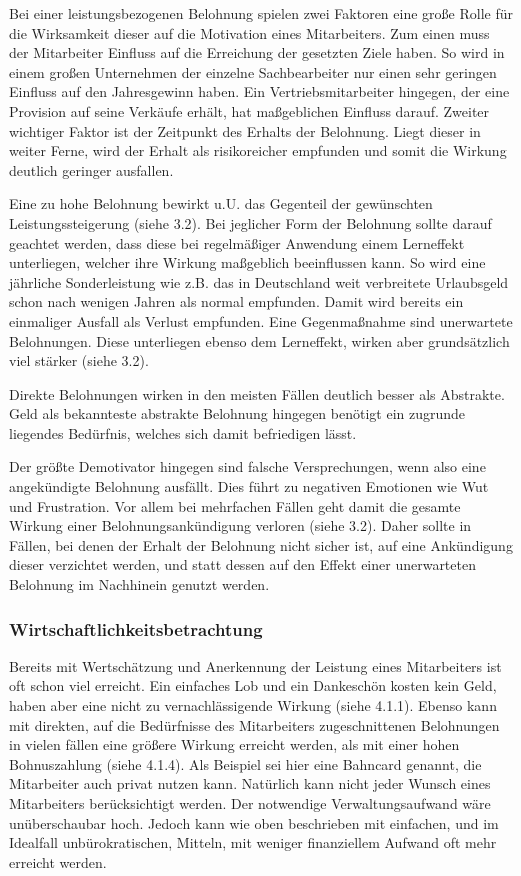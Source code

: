 Bei einer leistungsbezogenen Belohnung spielen zwei Faktoren eine große Rolle für die Wirksamkeit dieser auf die Motivation eines Mitarbeiters. Zum einen muss der Mitarbeiter Einfluss auf die Erreichung der gesetzten Ziele haben. So wird in einem großen Unternehmen der einzelne Sachbearbeiter nur einen sehr geringen Einfluss auf den Jahresgewinn haben. Ein Vertriebsmitarbeiter hingegen, der eine Provision auf seine Verkäufe erhält, hat maßgeblichen Einfluss darauf.
Zweiter wichtiger Faktor ist der Zeitpunkt des Erhalts der Belohnung. Liegt dieser in weiter Ferne, wird der Erhalt als risikoreicher empfunden und somit die Wirkung deutlich geringer ausfallen.

Eine zu hohe Belohnung bewirkt u.U. das Gegenteil der gewünschten Leistungssteigerung (siehe 3.2). Bei jeglicher Form der Belohnung sollte darauf geachtet werden, dass diese bei regelmäßiger Anwendung einem Lerneffekt unterliegen, welcher ihre Wirkung maßgeblich beeinflussen kann. So wird eine jährliche Sonderleistung wie z.B. das in Deutschland weit verbreitete Urlaubsgeld schon nach wenigen Jahren als normal empfunden. Damit wird bereits ein einmaliger Ausfall als Verlust empfunden. Eine Gegenmaßnahme sind unerwartete Belohnungen. Diese unterliegen ebenso dem Lerneffekt, wirken aber grundsätzlich viel stärker (siehe 3.2). 

Direkte Belohnungen wirken in den meisten Fällen deutlich besser als Abstrakte. Geld als bekannteste abstrakte Belohnung hingegen benötigt ein zugrunde liegendes Bedürfnis, welches sich damit befriedigen lässt.

Der größte Demotivator hingegen sind falsche Versprechungen, wenn also eine angekündigte Belohnung ausfällt. Dies führt zu negativen Emotionen wie Wut und Frustration. Vor allem bei mehrfachen Fällen geht damit die gesamte Wirkung einer Belohnungsankündigung verloren (siehe 3.2). Daher sollte in Fällen, bei denen der Erhalt der Belohnung nicht sicher ist, auf eine Ankündigung dieser verzichtet werden, und statt dessen auf den Effekt einer unerwarteten Belohnung im Nachhinein genutzt werden. 

\subsubsection{Wirtschaftlichkeitsbetrachtung}
Bereits mit Wertschätzung und Anerkennung der Leistung eines Mitarbeiters ist oft schon viel erreicht. Ein einfaches Lob und ein Dankeschön kosten kein Geld, haben aber eine nicht zu vernachlässigende Wirkung (siehe 4.1.1). Ebenso kann mit direkten, auf die Bedürfnisse des Mitarbeiters zugeschnittenen Belohnungen in vielen fällen eine größere Wirkung erreicht werden, als mit einer hohen Bohnuszahlung (siehe 4.1.4). Als Beispiel sei hier eine Bahncard genannt, die Mitarbeiter auch privat nutzen kann. 
Natürlich kann nicht jeder Wunsch eines Mitarbeiters berücksichtigt werden. Der notwendige Verwaltungsaufwand wäre unüberschaubar hoch. Jedoch kann wie oben beschrieben mit einfachen, und im Idealfall unbürokratischen, Mitteln, mit weniger finanziellem Aufwand oft mehr erreicht werden. 

